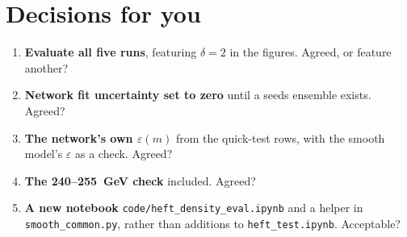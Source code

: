 \documentclass[11pt]{article}
\newcommand{\file}[1]{\nolinkurl{#1}}
\begin{document}
\section{Decisions for you}
\label{sec:decisions}

\begin{keyidea}
\begin{enumerate}
  \item \textbf{Evaluate all five runs}, featuring $\delta = 2$ in the figures. Agreed, or feature
    another?
  \item \textbf{Network fit uncertainty set to zero} until a seeds ensemble exists. Agreed?
  \item \textbf{The network's own $\varepsilon(m)$} from the quick-test rows, with the smooth model's
    $\varepsilon$ as a check. Agreed?
  \item \textbf{The 240--255~GeV check} included. Agreed?
  \item \textbf{A new notebook} \file{code/heft_density_eval.ipynb} and a helper in
    \file{smooth_common.py}, rather than additions to \file{heft_test.ipynb}. Acceptable?
\end{enumerate}
\end{keyidea}
\end{document}
